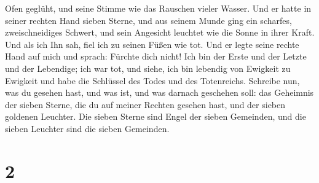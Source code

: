 Ofen geglüht, und seine Stimme wie das Rauschen vieler Wasser.
 Und er hatte in seiner rechten Hand sieben Sterne, und
aus seinem Munde ging ein scharfes, zweischneidiges Schwert, und sein
Angesicht leuchtet wie die Sonne in ihrer Kraft.  Und als
ich Ihn sah, fiel ich zu seinen Füßen wie tot. Und er legte seine rechte
Hand auf mich und sprach: Fürchte dich nicht! Ich bin der Erste und der
Letzte  und der Lebendige; ich war tot, und siehe, ich
bin lebendig von Ewigkeit zu Ewigkeit und habe die Schlüssel des Todes
und des Totenreichs.  Schreibe nun, was du gesehen hast,
und was ist, und was darnach geschehen soll:  das
Geheimnis der sieben Sterne, die du auf meiner Rechten gesehen hast, und
der sieben goldenen Leuchter. Die sieben Sterne sind Engel der sieben
Gemeinden, und die sieben Leuchter sind die sieben Gemeinden.

\hypertarget{section-1}{%
\section{2}\label{section-1}}

